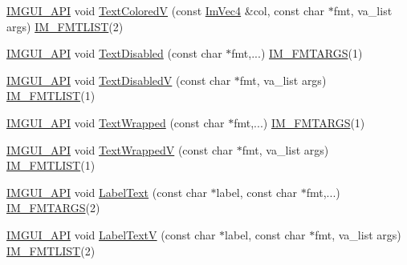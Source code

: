 \begin{DoxyCompactItemize}
\item 
\mbox{\hyperlink{imgui_8h_a43829975e84e45d1149597467a14bbf5}{I\+M\+G\+U\+I\+\_\+\+A\+PI}} void \mbox{\hyperlink{namespace_im_gui_a87c24ece994188a7145d8feecb4439ed}{Text\+ColoredV}} (const \mbox{\hyperlink{struct_im_vec4}{Im\+Vec4}} \&col, const char $\ast$fmt, va\+\_\+list args) \mbox{\hyperlink{imgui_8h_a047693beb7f899f5deab1e20202016b3}{I\+M\+\_\+\+F\+M\+T\+L\+I\+ST}}(2)
\item 
\mbox{\hyperlink{imgui_8h_a43829975e84e45d1149597467a14bbf5}{I\+M\+G\+U\+I\+\_\+\+A\+PI}} void \mbox{\hyperlink{namespace_im_gui_aa96bf14c5fa288e106820aeb4ba7fcb6}{Text\+Disabled}} (const char $\ast$fmt,...) \mbox{\hyperlink{imgui_8h_a1251c2f9ddac0873dbad8181bd82c9f1}{I\+M\+\_\+\+F\+M\+T\+A\+R\+GS}}(1)
\item 
\mbox{\hyperlink{imgui_8h_a43829975e84e45d1149597467a14bbf5}{I\+M\+G\+U\+I\+\_\+\+A\+PI}} void \mbox{\hyperlink{namespace_im_gui_a5b128d4f12d7e33e95fb9cef7dce027e}{Text\+DisabledV}} (const char $\ast$fmt, va\+\_\+list args) \mbox{\hyperlink{imgui_8h_a047693beb7f899f5deab1e20202016b3}{I\+M\+\_\+\+F\+M\+T\+L\+I\+ST}}(1)
\item 
\mbox{\hyperlink{imgui_8h_a43829975e84e45d1149597467a14bbf5}{I\+M\+G\+U\+I\+\_\+\+A\+PI}} void \mbox{\hyperlink{namespace_im_gui_ad57bb15c599e73b2ccc7c0f7de6e5823}{Text\+Wrapped}} (const char $\ast$fmt,...) \mbox{\hyperlink{imgui_8h_a1251c2f9ddac0873dbad8181bd82c9f1}{I\+M\+\_\+\+F\+M\+T\+A\+R\+GS}}(1)
\item 
\mbox{\hyperlink{imgui_8h_a43829975e84e45d1149597467a14bbf5}{I\+M\+G\+U\+I\+\_\+\+A\+PI}} void \mbox{\hyperlink{namespace_im_gui_a9019a388cd0c410bcb3d3ae63a008123}{Text\+WrappedV}} (const char $\ast$fmt, va\+\_\+list args) \mbox{\hyperlink{imgui_8h_a047693beb7f899f5deab1e20202016b3}{I\+M\+\_\+\+F\+M\+T\+L\+I\+ST}}(1)
\item 
\mbox{\hyperlink{imgui_8h_a43829975e84e45d1149597467a14bbf5}{I\+M\+G\+U\+I\+\_\+\+A\+PI}} void \mbox{\hyperlink{namespace_im_gui_ad92ccfbc33d448ff40cfcf9219177344}{Label\+Text}} (const char $\ast$label, const char $\ast$fmt,...) \mbox{\hyperlink{imgui_8h_a1251c2f9ddac0873dbad8181bd82c9f1}{I\+M\+\_\+\+F\+M\+T\+A\+R\+GS}}(2)
\item 
\mbox{\hyperlink{imgui_8h_a43829975e84e45d1149597467a14bbf5}{I\+M\+G\+U\+I\+\_\+\+A\+PI}} void \mbox{\hyperlink{namespace_im_gui_a55e5a7edb676a8f5cd7f65443138a8a0}{Label\+TextV}} (const char $\ast$label, const char $\ast$fmt, va\+\_\+list args) \mbox{\hyperlink{imgui_8h_a047693beb7f899f5deab1e20202016b3}{I\+M\+\_\+\+F\+M\+T\+L\+I\+ST}}(2)

\end{DoxyCompactItemize}
